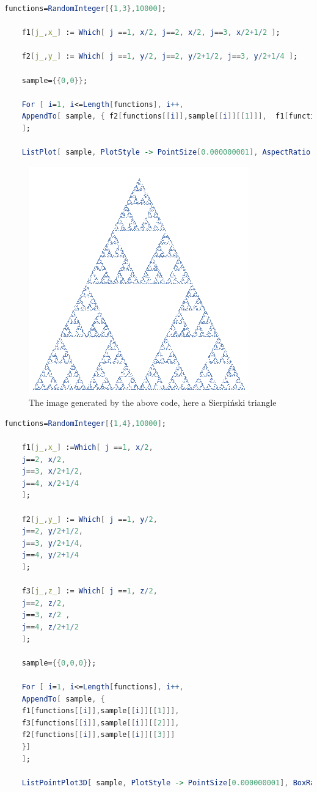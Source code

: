  
  \begin{lstlisting}[language=Mathematica,title={Mathematica code for 2-dimensional images}]
    functions=RandomInteger[{1,3},10000];
    
    f1[j_,x_] := Which[ j ==1, x/2, j==2, x/2, j==3, x/2+1/2 ];
    
    f2[j_,y_] := Which[ j ==1, y/2, j==2, y/2+1/2, j==3, y/2+1/4 ];
    
    sample={{0,0}};
    
    For [ i=1, i<=Length[functions], i++,
    AppendTo[ sample, { f2[functions[[i]],sample[[i]][[1]]],  f1[functions[[i]],sample[[i]][[2]]] }  
    ];
    
    ListPlot[ sample, PlotStyle -> PointSize[0.000000001], AspectRatio -> Automatic, Axes -> {False,False}]
  \end{lstlisting}
  
  \begin{figure}[htb]
        \centering
        \includegraphics[height=0.5\linewidth]{pics/appendix/2-d_mathematica.png}
        \caption*{The image generated by the above code, here a Sierpi{\'n}ski triangle}
    \end{figure}
  

 
  
  \newpage
  \begin{lstlisting}[language=Mathematica,title={Mathematica code for 3-dimensional images}]
    functions=RandomInteger[{1,4},10000];
    
    f1[j_,x_] :=Which[ j ==1, x/2,
    j==2, x/2,
    j==3, x/2+1/2,
    j==4, x/2+1/4
    ];
    
    f2[j_,y_] := Which[ j ==1, y/2,
    j==2, y/2+1/2,
    j==3, y/2+1/4,            
    j==4, y/2+1/4                   
    ];
    
    f3[j_,z_] := Which[ j ==1, z/2,
    j==2, z/2,
    j==3, z/2 ,                                       
    j==4, z/2+1/2                                                   
    ];
    
    sample={{0,0,0}};
    
    For [ i=1, i<=Length[functions], i++,
    AppendTo[ sample, {
    f1[functions[[i]],sample[[i]][[1]]],  
    f3[functions[[i]],sample[[i]][[2]]],
    f2[functions[[i]],sample[[i]][[3]]]   
    }]
    ];
    
    ListPointPlot3D[ sample, PlotStyle -> PointSize[0.000000001], BoxRatios -> Automatic, Ticks -> None]
  \end{lstlisting}
 
